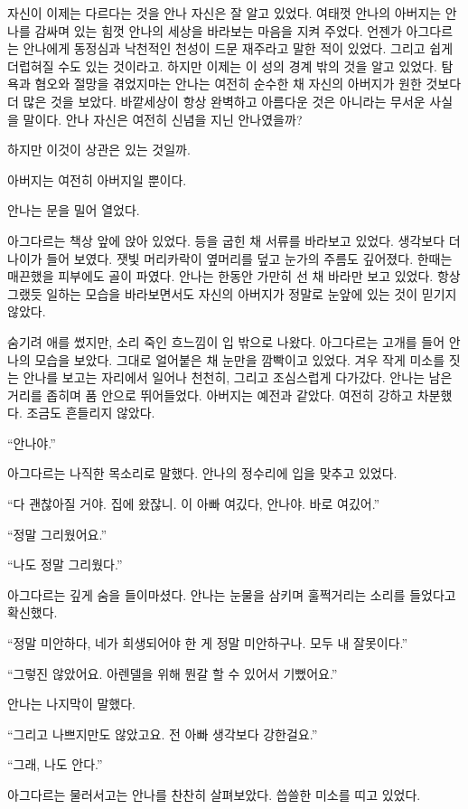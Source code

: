 자신이 이제는 다르다는 것을 안나 자신은 잘 알고 있었다. 여태껏 안나의 아버지는 안나를 감싸며 있는 힘껏 안나의 세상을 바라보는 마음을 지켜 주었다. 언젠가 아그다르는 안나에게 동정심과 낙천적인 천성이 드문 재주라고 말한 적이 있었다. 그리고 쉽게 더럽혀질 수도 있는 것이라고. 하지만 이제는 이 성의 경계 밖의 것을 알고 있었다. 탐욕과 혐오와 절망을 겪었지마는 안나는 여전히 순수한 채 자신의 아버지가 원한 것보다 더 많은 것을 보았다. 바깥세상이 항상 완벽하고 아름다운 것은 아니라는 무서운 사실을 말이다. 안나 자신은 여전히 신념을 지닌 안나였을까?

하지만 이것이 상관은 있는 것일까.

아버지는 여전히 아버지일 뿐이다.

안나는 문을 밀어 열었다.

아그다르는 책상 앞에 앉아 있었다. 등을 굽힌 채 서류를 바라보고 있었다. 생각보다 더 나이가 들어 보였다. 잿빛 머리카락이 옆머리를 덮고 눈가의 주름도 깊어졌다. 한때는 매끈했을 피부에도 골이 파였다. 안나는 한동안 가만히 선 채 바라만 보고 있었다. 항상 그랬듯 일하는 모습을 바라보면서도 자신의 아버지가 정말로 눈앞에 있는 것이 믿기지 않았다.

숨기려 애를 썼지만, 소리 죽인 흐느낌이 입 밖으로 나왔다. 아그다르는 고개를 들어 안나의 모습을 보았다. 그대로 얼어붙은 채 눈만을 깜빡이고 있었다. 겨우 작게 미소를 짓는 안나를 보고는 자리에서 일어나 천천히, 그리고 조심스럽게 다가갔다. 안나는 남은 거리를 좁히며 품 안으로 뛰어들었다. 아버지는 예전과 같았다. 여전히 강하고 차분했다. 조금도 흔들리지 않았다.

``안나야.''

아그다르는 나직한 목소리로 말했다. 안나의 정수리에 입을 맞추고 있었다.

``다 괜찮아질 거야. 집에 왔잖니. 이 아빠 여깄다, 안나야. 바로 여깄어.''

``정말 그리웠어요.''

``나도 정말 그리웠다.''

아그다르는 깊게 숨을 들이마셨다. 안나는 눈물을 삼키며 훌쩍거리는 소리를 들었다고 확신했다.

``정말 미안하다, 네가 희생되어야 한 게 정말 미안하구나. 모두 내 잘못이다.''

``그렇진 않았어요. 아렌델을 위해 뭔갈 할 수 있어서 기뻤어요.''

안나는 나지막이 말했다.

``그리고 나쁘지만도 않았고요. 전 아빠 생각보다 강한걸요.''

``그래, 나도 안다.''

아그다르는 물러서고는 안나를 찬찬히 살펴보았다. 씁쓸한 미소를 띠고 있었다.

